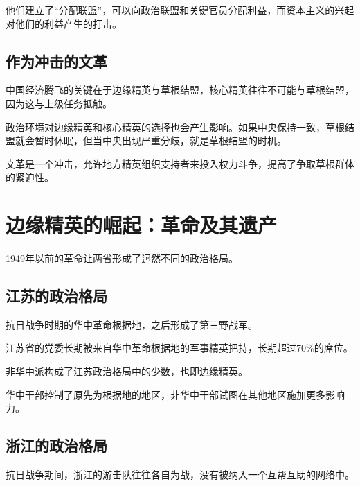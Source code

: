 \documentclass[
]{book}
\begin{document}
他们建立了``分配联盟''，可以向政治联盟和关键官员分配利益，而资本主义的兴起对他们的利益产生的打击。

\hypertarget{ux4f5cux4e3aux51b2ux51fbux7684ux6587ux9769}{%
\section{作为冲击的文革}\label{ux4f5cux4e3aux51b2ux51fbux7684ux6587ux9769}}

中国经济腾飞的关键在于边缘精英与草根结盟，核心精英往往不可能与草根结盟，因为这与上级任务抵触。

政治环境对边缘精英和核心精英的选择也会产生影响。如果中央保持一致，草根结盟就会暂时休眠，但当中央出现严重分歧，就是草根结盟的时机。

文革是一个冲击，允许地方精英组织支持者来投入权力斗争，提高了争取草根群体的紧迫性。

\hypertarget{ux8fb9ux7f18ux7cbeux82f1ux7684ux5d1bux8d77ux9769ux547dux53caux5176ux9057ux4ea7}{%
\chapter{边缘精英的崛起：革命及其遗产}\label{ux8fb9ux7f18ux7cbeux82f1ux7684ux5d1bux8d77ux9769ux547dux53caux5176ux9057ux4ea7}}

1949年以前的革命让两省形成了迥然不同的政治格局。

\hypertarget{ux6c5fux82cfux7684ux653fux6cbbux683cux5c40}{%
\section{江苏的政治格局}\label{ux6c5fux82cfux7684ux653fux6cbbux683cux5c40}}

抗日战争时期的华中革命根据地，之后形成了第三野战军。

江苏省的党委长期被来自华中革命根据地的军事精英把持，长期超过70\%的席位。

非华中派构成了江苏政治格局中的少数，也即边缘精英。

华中干部控制了原先为根据地的地区，非华中干部试图在其他地区施加更多影响力。

\hypertarget{ux6d59ux6c5fux7684ux653fux6cbbux683cux5c40}{%
\section{浙江的政治格局}\label{ux6d59ux6c5fux7684ux653fux6cbbux683cux5c40}}

抗日战争期间，浙江的游击队往往各自为战，没有被纳入一个互帮互助的网络中。
\end{document}
